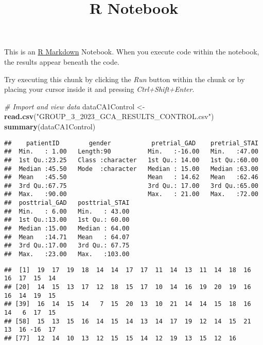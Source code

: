 \documentclass[
]{article}
\title{R Notebook}
\author{}
\date{\vspace{-2.5em}}
\newenvironment{Shaded}{\begin{snugshade}}{\end{snugshade}}
\newcommand{\CommentTok}[1]{\textcolor[rgb]{0.56,0.35,0.01}{\textit{#1}}}
\newcommand{\FunctionTok}[1]{\textcolor[rgb]{0.13,0.29,0.53}{\textbf{#1}}}
\newcommand{\NormalTok}[1]{#1}
\newcommand{\OtherTok}[1]{\textcolor[rgb]{0.56,0.35,0.01}{#1}}
\newcommand{\SpecialCharTok}[1]{\textcolor[rgb]{0.81,0.36,0.00}{\textbf{#1}}}
\newcommand{\StringTok}[1]{\textcolor[rgb]{0.31,0.60,0.02}{#1}}
\begin{document}
\maketitle

This is an \href{http://rmarkdown.rstudio.com}{R Markdown} Notebook.
When you execute code within the notebook, the results appear beneath
the code.

Try executing this chunk by clicking the \emph{Run} button within the
chunk or by placing your cursor inside it and pressing
\emph{Ctrl+Shift+Enter}.

\begin{Shaded}
\begin{Highlighting}[]
\CommentTok{\# Import and view data}
\NormalTok{dataCA1Control }\OtherTok{\textless{}{-}} \FunctionTok{read.csv}\NormalTok{(}\StringTok{"GROUP\_3\_2023\_GCA\_RESULTS\_CONTROL.csv"}\NormalTok{)}
\FunctionTok{summary}\NormalTok{(dataCA1Control)}
\end{Highlighting}
\end{Shaded}

\begin{verbatim}
##    patientID        gender           pretrial_GAD    pretrial_STAI  
##  Min.   : 1.00   Length:90          Min.   :-16.00   Min.   :47.00  
##  1st Qu.:23.25   Class :character   1st Qu.: 14.00   1st Qu.:60.00  
##  Median :45.50   Mode  :character   Median : 15.00   Median :63.00  
##  Mean   :45.50                      Mean   : 14.62   Mean   :62.46  
##  3rd Qu.:67.75                      3rd Qu.: 17.00   3rd Qu.:65.00  
##  Max.   :90.00                      Max.   : 21.00   Max.   :72.00  
##  posttrial_GAD   posttrial_STAI  
##  Min.   : 6.00   Min.   : 43.00  
##  1st Qu.:13.00   1st Qu.: 60.00  
##  Median :15.00   Median : 64.00  
##  Mean   :14.71   Mean   : 64.07  
##  3rd Qu.:17.00   3rd Qu.: 67.75  
##  Max.   :23.00   Max.   :103.00
\end{verbatim}

\begin{Shaded}
\end{Shaded}

\begin{verbatim}
##  [1]  19  17  19  18  14  14  17  17  11  14  13  11  14  18  16  16  17  15  14
## [20]  14  15  13  17  12  18  15  17  10  14  16  19  20  19  16  16  14  19  15
## [39]  16  14  15  14   7  15  20  13  10  21  14  14  15  18  16  14   6  17  15
## [58]  15  13  15  16  14  15  14  13  14  17  19  12  14  15  21  13  16 -16  17
## [77]  12  14  10  13  12  15  15  14  12  19  13  15  12  16
\end{verbatim}
\end{document}
